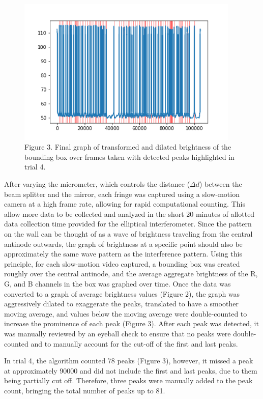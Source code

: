\documentclass{article}
\begin{document}
\begin{figure}[!ht]
\begingroup
    \rightskip
    \leftskip
    \begin{center}
        \includegraphics[width=300pt,height=200pt]{4_final.png}
        \caption*{Figure 3. Final graph of transformed and dilated brightness of the bounding box over frames taken with detected peaks highlighted in trial 4.}
    \end{center}
\endgroup
\end{figure}
After varying the micrometer, which controls the distance ($\Delta d$) between the beam splitter and the mirror, each fringe was captured using a slow-motion camera at a high frame rate, allowing for rapid computational counting. This allow more data to be collected and analyzed in the short 20 minutes of allotted data collection time provided for the elliptical interferometer. Since the pattern on the wall can be thought of as a wave of brightness traveling from the central antinode outwards, the graph of brightness at a specific point should also be approximately the same wave pattern as the interference pattern. Using this principle, for each slow-motion video captured, a bounding box was created roughly over the central antinode, and the average aggregate brightness of the R, G, and B channels in the box was graphed over time. Once the data was converted to a graph of average brightness values (Figure 2), the graph was aggressively dilated to exaggerate the peaks, translated to have a smoother moving average, and values below the moving average were double-counted to increase the prominence of each peak (Figure 3). After each peak was detected, it was manually reviewed by an eyeball check to ensure that no peaks were double-counted and to manually account for the cut-off of the first and last peaks.

\bigskip

In trial 4, the algorithm counted 78 peaks (Figure 3), however, it missed a peak at approximately 90000 and did not include the first and last peaks, due to them being partially cut off. Therefore, three peaks were manually added to the peak count, bringing the total number of peaks up to 81.
\end{document}
